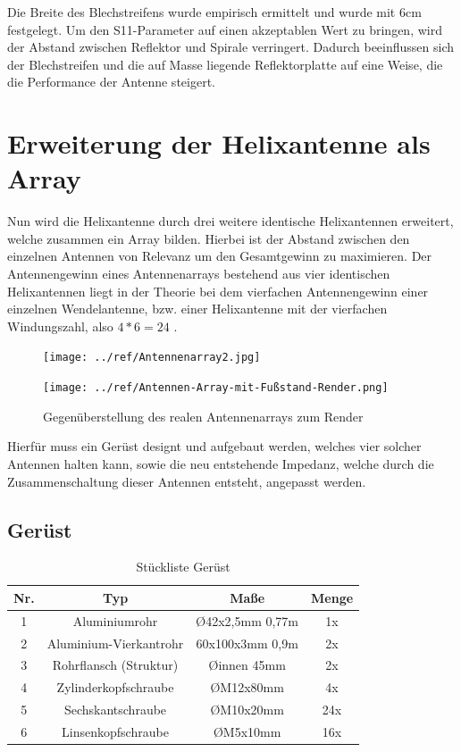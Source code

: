 Die Breite des Blechstreifens wurde empirisch ermittelt und wurde mit 6cm festgelegt. Um den S11-Parameter auf einen akzeptablen Wert zu bringen, wird der Abstand zwischen Reflektor und Spirale verringert. Dadurch beeinflussen sich der Blechstreifen und die auf Masse liegende Reflektorplatte auf eine Weise, die die Performance der Antenne steigert.

\section{Erweiterung der Helixantenne als Array}
Nun wird die Helixantenne durch drei weitere identische Helixantennen erweitert, welche zusammen ein Array bilden. Hierbei ist der Abstand zwischen den einzelnen Antennen von Relevanz um den Gesamtgewinn zu maximieren.
Der Antennengewinn eines Antennenarrays bestehend aus vier identischen Helixantennen liegt in der Theorie bei dem vierfachen Antennengewinn einer einzelnen Wendelantenne, bzw. einer Helixantenne mit der vierfachen Windungszahl, also $4*6=24$ \cite[p. 319]{Kraus-2002-AntennasB}.

\begin{figure}[H]
	\begin{minipage}[b]{.4\linewidth} %
		\texttt{[image: ../ref/Antennenarray2.jpg]}
		\label{fig:helixantennen-array}
	\end{minipage}
	\hspace{.1\linewidth}%
	\begin{minipage}[b]{.4\linewidth} %
		\texttt{[image: ../ref/Antennen-Array-mit-Fußstand-Render.png]}
		\label{fig:helixantennen-array-render}
	\end{minipage}
	\caption{Gegenüberstellung des realen Antennenarrays zum Render}
\end{figure}

Hierfür muss ein Gerüst designt und aufgebaut werden, welches vier solcher Antennen halten kann, sowie die neu entstehende Impedanz, welche durch die Zusammenschaltung dieser Antennen entsteht, angepasst werden.

\subsection{Gerüst}
\label{subsec:helix_geruest}
\begin{table}
	\begin{tabular}{|c|c|c|c|}
	\hline
	Nr. & Typ & Maße & Menge \\
	\hline
	1 & Aluminiumrohr & \O42x2,5mm 0,77m & 1x \\
	\hline
	2 & Aluminium-Vierkantrohr & 60x100x3mm 0,9m & 2x \\
	\hline
	3 & Rohrflansch (Struktur) & \O innen 45mm & 2x\\
	\hline
	4 & Zylinderkopfschraube & \O M12x80mm & 4x\\
	\hline
	5 & Sechskantschraube & \O M10x20mm & 24x\\
	\hline
	6 & Linsenkopfschraube & \O M5x10mm & 16x\\
	\hline
\end{tabular}
\caption{Stückliste Gerüst}
\end{table}

